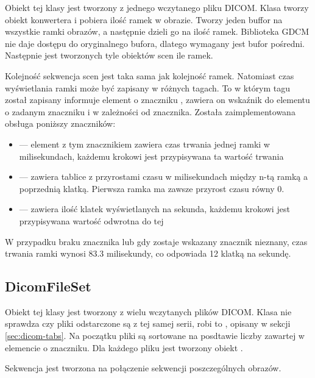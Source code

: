 \par
Obiekt tej klasy jest tworzony z jednego wczytanego pliku DICOM.
Klasa tworzy obiekt konwertera i pobiera ilość ramek w obrazie.
Tworzy jeden buffor na wszystkie ramki obrazów, a następnie dzieli go na ilość ramek.
Biblioteka GDCM nie daje dostępu do oryginalnego bufora, dlatego wymagany jest bufor pośredni.
Następnie jest tworzonych tyle obiektów scen ile ramek.
\par
Kolejność sekwencja scen jest taka sama jak kolejność ramek.
Natomiast czas wyświetlania ramki może być zapisany w różnych tagach.
To w którym tagu został zapisany informuje element o znaczniku , zawiera on wskaźnik do elementu o zadanym znaczniku i w zależności od znacznika.
Została zaimplementowana obsługa poniższy znaczników:
\begin{itemize}
    \item {} --- element z tym znacznikiem zawiera czas trwania jednej ramki w milisekundach, każdemu krokowi jest przypisywana ta wartość trwania

    \item {} --- zawiera tablice z przyrostami czasu w milisekundach między n-tą ramką a poprzednią klatką. Pierwsza ramka ma zawsze przyrost czasu równy 0.
    
    \item {} --- zawiera ilość klatek wyświetlanych na sekunda, każdemu krokowi jest przypisywana wartość odwrotna do tej
\end{itemize}
W przypadku braku znacznika lub gdy zostaje wskazany znacznik nieznany, czas trwania ramki wynosi $83.3$ milisekundy, co odpowiada 12 klatką na sekundę.


\subsection{DicomFileSet}
\par
Obiekt tej klasy jest tworzony z wielu wczytanych plików DICOM.
Klasa nie sprawdza czy pliki odstarczone są z tej samej serii, robi to , opisany w sekcji \ref{sec:dicom-tabs}.
Na początku pliki są sortowane na posdtawie liczby zawartej w elemencie o znaczniku.
Dla każdego pliku jest tworzony obiekt .
\par
Sekwencja jest tworzona na połączenie sekwencji poszczególnych obrazów.
